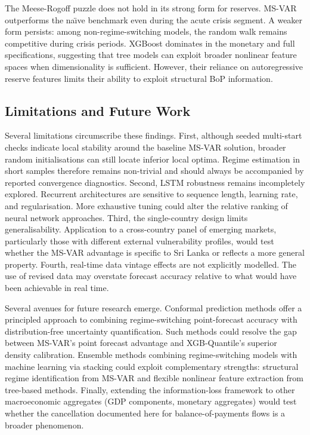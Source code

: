 \documentclass[12pt,a4paper]{article}
\begin{document}
The Meese-Rogoff puzzle does not hold in its strong form for reserves. MS-VAR outperforms the na\"{\i}ve benchmark even during the acute crisis segment. A weaker form persists: among non-regime-switching models, the random walk remains competitive during crisis periods. XGBoost dominates in the monetary and full specifications, suggesting that tree models can exploit broader nonlinear feature spaces when dimensionality is sufficient. However, their reliance on autoregressive reserve features limits their ability to exploit structural BoP information.

\subsection{Limitations and Future Work}

Several limitations circumscribe these findings. First, although seeded multi-start checks indicate local stability around the baseline MS-VAR solution, broader random initialisations can still locate inferior local optima. Regime estimation in short samples therefore remains non-trivial and should always be accompanied by reported convergence diagnostics. Second, LSTM robustness remains incompletely explored. Recurrent architectures are sensitive to sequence length, learning rate, and regularisation. More exhaustive tuning could alter the relative ranking of neural network approaches. Third, the single-country design limits generalisability. Application to a cross-country panel of emerging markets, particularly those with different external vulnerability profiles, would test whether the MS-VAR advantage is specific to Sri Lanka or reflects a more general property. Fourth, real-time data vintage effects are not explicitly modelled. The use of revised data may overstate forecast accuracy relative to what would have been achievable in real time.

Several avenues for future research emerge. Conformal prediction methods offer a principled approach to combining regime-switching point-forecast accuracy with distribution-free uncertainty quantification. Such methods could resolve the gap between MS-VAR's point forecast advantage and XGB-Quantile's superior density calibration. Ensemble methods combining regime-switching models with machine learning via stacking could exploit complementary strengths: structural regime identification from MS-VAR and flexible nonlinear feature extraction from tree-based methods. Finally, extending the information-loss framework to other macroeconomic aggregates (GDP components, monetary aggregates) would test whether the cancellation documented here for balance-of-payments flows is a broader phenomenon.
\end{document}
